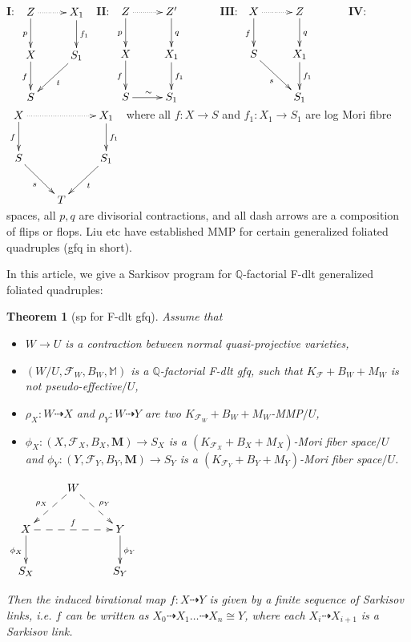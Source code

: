 \documentclass[11pt]{amsart}
\numberwithin{equation}{section}
\newtheorem{thm}{Theorem}[subsection]
\theoremstyle{definition}
\theoremstyle{definition}
\theoremstyle{definition}
\begin{document}
  $\textbf{I}$:
  $\xymatrix{
      Z\ar[d]_p\ar@{.>}[r]&X_1\ar[d]^{f_1}\\
      X\ar[d]_f&S_1\ar[dl]^{t}\\
      S &}$
  $\textbf{II}$:
  $\xymatrix{
      Z\ar[d]_p\ar@{.>}[r]&Z'\ar[d]^{q}&\\
      X\ar[d]_{f}&X_1\ar[d]^{f_1}\\
      S\ar[r]^{\sim}&S_1}$
  $\textbf{III}$:
  $
    \xymatrix{
    X\ar@{.>}[r]\ar[d]_f& Z\ar[d]^q& \\
    S\ar[rd]_{s}         & X_{1}\ar[d]^{f_{1}}&\\
    &S_{1}
    }
  $
  $\textbf{IV}$:
  $\xymatrix{
      X\ar[d]_f\ar@{.>}[rr]&&X_1\ar[d]^{f_1}\\
      S\ar[dr]_{s}&&S_1\ar[dl]^{t}\\
      &T &}$
  where all $ f:X\to S $ and $ f_1:X_1\to S_1 $ are log Mori fibre spaces, all $ p,q $ are divisorial contractions, and all dash arrows are a composition of flips or flops.
Liu etc have established MMP for certain generalized foliated quadruples (gfq in short).


In this article, we give a Sarkisov program for $\mathbb{Q}$-factorial F-dlt generalized foliated quadruples:
\begin{thm}[sp for F-dlt gfq] \label{thm: gfqsp}
  Assume that
  \begin{itemize}
    \item $W\rightarrow U$ is a contraction between normal quasi-projective varieties,
    \item $(W/U,\mathcal{F}_{W},B_{W},\mathbb{M})$ is a $\mathbb Q$-factorial F-dlt gfq, such that $K_\mathcal{F}+B_W+M_W$ is not pseudo-effective$/U$,
    \item $\rho_X: W\dashrightarrow X$ and $\rho_Y: W\dashrightarrow Y$ are two $K_{ \mathcal{F}_{W} }+B_W+M_W$-MMP$/U$,
    \item $\phi_X: (X,\mathcal{F}_{X},B_{X},\mathbf{M})  \rightarrow S_X$ is a $(K_{\mathcal{F}_{X}}+B_X+M_X)$-Mori fiber space$/U$ and $\phi_Y: (Y,\mathcal{F}_{Y},B_{Y},\mathbf{M})  \rightarrow S_Y$ is a $(K_{\mathcal{F}_{Y}} +B_Y+M_Y)$-Mori fiber space$/U$.
  \end{itemize}
  \begin{center}$\xymatrix{
        & W\ar@{-->}[dl]_{\rho_X}\ar@{-->}[dr]^{\rho_Y}& \\
        X \ar@{->}[d]_{\phi_X}\ar@{-->}[rr]^{f}   &  & Y\ar@{->}[d]^{\phi_Y} \\
        S_X & &S_Y }$
  \end{center}
  Then the induced birational map $f: X\dashrightarrow Y$ is given by a finite sequence of Sarkisov links, i.e. $f$ can be written as $X_0\dashrightarrow X_1\dots\dashrightarrow X_n\cong Y$, where each $X_{i}\dashrightarrow X_{i+1}$ is a Sarkisov link.
\end{thm}
\end{document}
